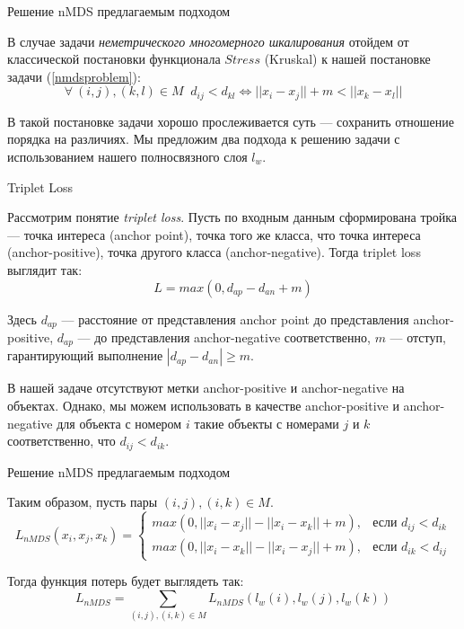 \documentclass[9pt]{beamer}
\begin{document}
\begin{frame}{Решение nMDS предлагаемым подходом}

В случае задачи \textit{неметрического многомерного шкалирования} отойдем от классической постановки функционала $Stress$ (Kruskal) к нашей постановке задачи (\ref{nmdsproblem}):
$$
            \forall \: (i, j), (k,l) \in M \; \; d_{ij} < d_{kl} \Longleftrightarrow ||x_i - x_j|| + m < ||x_k - x_l||
$$

В такой постановке задачи хорошо прослеживается суть --- сохранить отношение порядка на различиях. Мы предложим два подхода к решению задачи с использованием нашего полносвязного слоя $l_w$.
    
\end{frame}

\begin{frame}{Triplet Loss}

Рассмотрим понятие \textit{triplet loss}. Пусть по входным данным сформирована тройка --- точка интереса (anchor point), точка того же класса, что точка интереса (anchor-positive), точка другого класса (anchor-negative). Тогда triplet loss выглядит так:
\begin{equation}
\label{triplet}
L = max(0, d_{ap} - d_{an} + m)
\end{equation}

Здесь $d_{ap}$ --- расстояние от представления anchor point до представления anchor-positive, $d_{ap}$ --- до представления anchor-negative соответственно, $m$ --- отступ, гарантирующий выполнение $|d_{ap} - d_{an}| \geq m$.
\vspace{\baselineskip} 

В нашей задаче отсутствуют метки anchor-positive и anchor-negative на объектах. Однако, мы можем использовать в качестве anchor-positive и anchor-negative для объекта с номером $i$ такие объекты с номерами $j$ и $k$ соответственно, что $d_{ij} < d_{ik}$.
    
\end{frame}

\begin{frame}{Решение nMDS предлагаемым подходом}

Таким образом, пусть пары $(i, j), (i, k) \in M$.
\begin{equation}
    L_{nMDS}(x_i, x_j, x_k) = \begin{cases}
                max(0, ||x_i - x_j|| - ||x_i - x_k|| + m),&\text{если $d_{ij} < d_{ik}$}\\
                max(0, ||x_i - x_k|| - ||x_i - x_j|| + m), &\text{если $d_{ik} < d_{ij}$}
                        \end{cases}
\end{equation}

Тогда функция потерь будет выглядеть так:
\begin{equation}
    L_{nMDS} = \sum_{(i, j), (i, k) \in M} L_{nMDS}(l_w(i), l_w(j), l_w(k)) 
\end{equation}
    
\end{frame}
\end{document}
